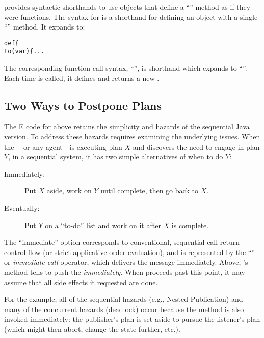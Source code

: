 \documentclass{llncs}
\begin{document}
 provides syntactic shorthands to use objects that define a
``'' method as if they were functions. The syntax for
 is a shorthand for defining an object with a
single ``'' method. It expands to:
%
\begin{alltt}
    def  \{
        to (var ) \{ ...
\end{alltt}
%
The corresponding function call syntax,
``'', is shorthand which expands to
``''. Each time  is
called, it defines and returns a new .

\subsection{Two Ways to Postpone Plans}

The E code for  above retains the simplicity and
hazards of the sequential Java version.  To address these hazards
requires examining the underlying issues.  When the
---or any agent---is executing plan $X$ and
discovers the need to engage in plan $Y$, in a sequential system, it
has two simple alternatives of when to do $Y$:
%
\begin{description}

\item[Immediately:] Put $X$ aside, work on $Y$ until
complete, then go back to $X$.

\item[Eventually:] Put $Y$ on a ``to-do'' list and work on it after
$X$ is complete.

\end{description}
%
The ``immediate'' option corresponds to conventional, sequential
call-return control flow (or strict applicative-order evaluation), and
is represented by the ``'' or \emph{immediate-call} operator,
which delivers the message immediately. Above, 's
 method tells  to push the
 \emph{immediately}. When  proceeds past
this point, it may assume that all side effects it requested are done.

For the  example, all of the sequential hazards
(e.g., Nested Publication) and many of the concurrent hazards
(deadlock) occur because the  method is also
invoked immediately: the publisher's plan is set aside to pursue the
listener's plan (which might then abort, change the state further,
etc.).
\end{document}
